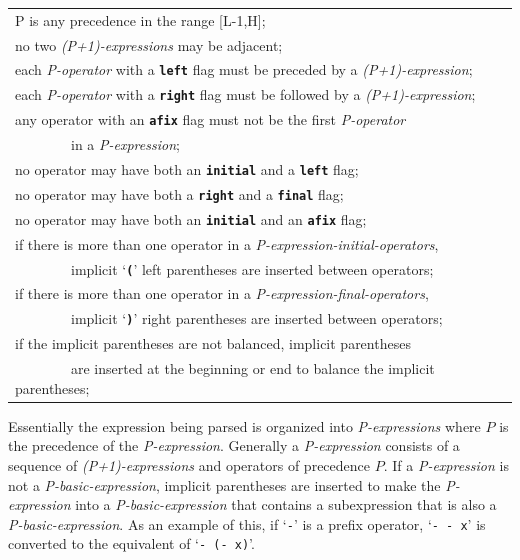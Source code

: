 \documentclass[12pt]{article}
\newcommand{\TT}[1]{{\tt \bfseries #1}}
\newenvironment{indpar}[1][0.3in]%
	{\begin{list}{}%
		     {\setlength{\itemsep}{0in}%
		      \setlength{\topsep}{0in}%
		      \setlength{\parsep}{1ex}%
		      \setlength{\labelwidth}{#1}%
		      \setlength{\leftmargin}{#1}%
		      \addtolength{\leftmargin}{\labelsep}}%
	 \item}%
	{\end{list}}
\begin{document}
\begin{indpar}
\begin{tabular}[t]{l}
       P is any precedence in the range [L-1,H]; \\
       no two {\em (P+1)-expressions} may be adjacent; \\
       each {\em P-operator} with a \TT{left} flag must be
              preceded by a {\em (P+1)-expression}; \\
       each {\em P-operator} with a \TT{right} flag must be
	  followed by a {\em (P+1)-expression}; \\
       any operator with an \TT{afix} flag must not be the first
           {\em P-operator} \\
       ~~~~~~~~in a {\em P-expression}; \\
       no operator may have both an \TT{initial} and a \TT{left} flag; \\
       no operator may have both a \TT{right} and a \TT{final} flag; \\
       no operator may have both an \TT{initial} and an \TT{afix} flag; \\
       if there is more than one operator in a
           {\em P-expression-initial-operators}, \\
       ~~~~~~~~implicit `\TT{(}' left parentheses are inserted between
                                 operators; \\
       if there is more than one operator in a
           {\em P-expression-final-operators}, \\
       ~~~~~~~~implicit `\TT{)}' right parentheses are inserted between
                                 operators; \\
       if the implicit parentheses are not balanced, implicit parentheses \\
       ~~~~~~~~are inserted at the beginning or end to balance the
               implicit parentheses;
       \end{tabular}
\end{indpar}

Essentially the expression being parsed is organized into {\em P-expressions}
where $P$ is the precedence of the {\em P-expression}.  Generally
a {\em P-expression} consists of a sequence of {\em (P+1)-expressions}
and operators of precedence $P$.
If a {\em P-expression} is not a {\em P-basic-expression}, implicit
parentheses are inserted to make the {\em P-expression} into a
{\em P-basic-expression} that contains a subexpression that is
also a {\em P-basic-expression}.  As an example of this, if `{\tt -}'
is a prefix operator, `{\tt - - x}' is converted to the equivalent
of `{\tt - (- x)}'.
\end{document}
